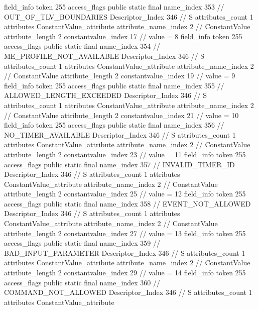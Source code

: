 {{{{			field_info {
				token	255
				access_flags	public static final
				name_index	353		// OUT_OF_TLV_BOUNDARIES
				Descriptor_Index	346		// S
				attributes_count	1
				attributes {
				ConstantValue_attribute {
					attribute_name_index	2		// ConstantValue
					attribute_length	2
					constantvalue_index	17		// value = 8
				}
				}
			}
			field_info {
				token	255
				access_flags	public static final
				name_index	354		// ME_PROFILE_NOT_AVAILABLE
				Descriptor_Index	346		// S
				attributes_count	1
				attributes {
				ConstantValue_attribute {
					attribute_name_index	2		// ConstantValue
					attribute_length	2
					constantvalue_index	19		// value = 9
				}
				}
			}
			field_info {
				token	255
				access_flags	public static final
				name_index	355		// ALLOWED_LENGTH_EXCEEDED
				Descriptor_Index	346		// S
				attributes_count	1
				attributes {
				ConstantValue_attribute {
					attribute_name_index	2		// ConstantValue
					attribute_length	2
					constantvalue_index	21		// value = 10
				}
				}
			}
			field_info {
				token	255
				access_flags	public static final
				name_index	356		// NO_TIMER_AVAILABLE
				Descriptor_Index	346		// S
				attributes_count	1
				attributes {
				ConstantValue_attribute {
					attribute_name_index	2		// ConstantValue
					attribute_length	2
					constantvalue_index	23		// value = 11
				}
				}
			}
			field_info {
				token	255
				access_flags	public static final
				name_index	357		// INVALID_TIMER_ID
				Descriptor_Index	346		// S
				attributes_count	1
				attributes {
				ConstantValue_attribute {
					attribute_name_index	2		// ConstantValue
					attribute_length	2
					constantvalue_index	25		// value = 12
				}
				}
			}
			field_info {
				token	255
				access_flags	public static final
				name_index	358		// EVENT_NOT_ALLOWED
				Descriptor_Index	346		// S
				attributes_count	1
				attributes {
				ConstantValue_attribute {
					attribute_name_index	2		// ConstantValue
					attribute_length	2
					constantvalue_index	27		// value = 13
				}
				}
			}
			field_info {
				token	255
				access_flags	public static final
				name_index	359		// BAD_INPUT_PARAMETER
				Descriptor_Index	346		// S
				attributes_count	1
				attributes {
				ConstantValue_attribute {
					attribute_name_index	2		// ConstantValue
					attribute_length	2
					constantvalue_index	29		// value = 14
				}
				}
			}
			field_info {
				token	255
				access_flags	public static final
				name_index	360		// COMMAND_NOT_ALLOWED
				Descriptor_Index	346		// S
				attributes_count	1
				attributes {
				ConstantValue_attribute {
}}}}}}}
